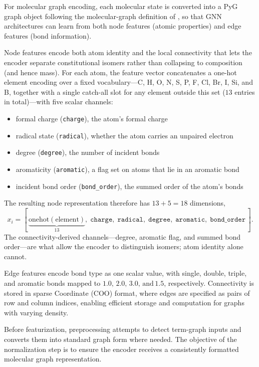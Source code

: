 For molecular graph encoding, each molecular state is converted into a PyG graph object following the molecular-graph definition of , so that GNN architectures can learn from both node features (atomic properties) and edge features (bond information).

Node features encode both atom identity and the local connectivity that lets the encoder separate constitutional isomers rather than collapsing to composition (and hence mass).
For each atom, the feature vector concatenates a one-hot element encoding over a fixed vocabulary---C, H, O, N, S, P, F, Cl, Br, I, Si, and B, together with a single catch-all slot for any element outside this set ($13$ entries in total)---with five scalar channels:
\begin{itemize}
    \item formal charge (\texttt{charge}), the atom's formal charge
    \item radical state (\texttt{radical}), whether the atom carries an unpaired electron
    \item degree (\texttt{degree}), the number of incident bonds
    \item aromaticity (\texttt{aromatic}), a flag set on atoms that lie in an aromatic bond
    \item incident bond order (\texttt{bond\_order}), the summed order of the atom's bonds
\end{itemize}
The resulting node representation therefore has $13 + 5 = 18$ dimensions,
\[
x_i = [\,\underbrace{\mathrm{onehot}(\text{element})}_{13},\; \texttt{charge},\; \texttt{radical},\; \texttt{degree},\; \texttt{aromatic},\; \texttt{bond\_order}\,].
\]
The connectivity-derived channels---degree, aromatic flag, and summed bond order---are what allow the encoder to distinguish isomers; atom identity alone cannot.

Edge features encode bond type as one scalar value, with single, double, triple, and aromatic bonds mapped to $1.0, \, 2.0, \, 3.0, \, \text{and} \, 1.5$, respectively.
Connectivity is stored in sparse Coordinate (COO) format, where edges are specified as pairs of row and column indices, enabling efficient storage and computation for graphs with varying density.

Before featurization, preprocessing attempts to detect term-graph inputs and converts them into standard graph form where needed.
The objective of the normalization step is to ensure the encoder receives a consistently formatted molecular graph representation.


